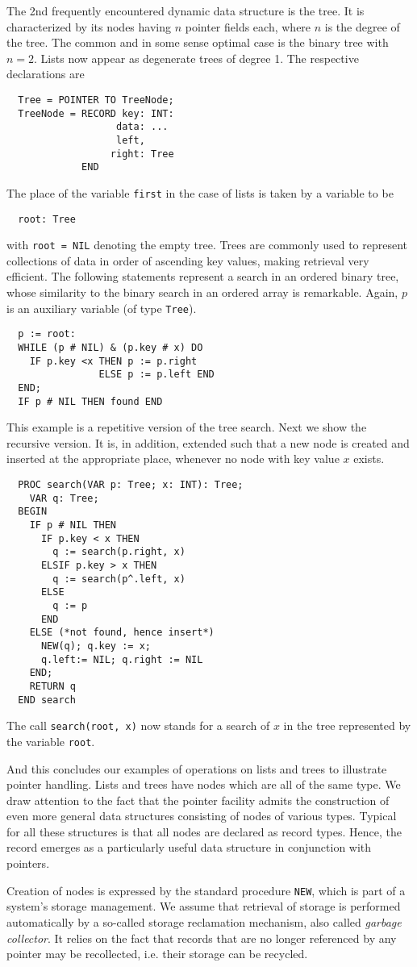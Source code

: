 The 2nd frequently encountered dynamic data structure is the tree. It is characterized by
its nodes having $n$ pointer fields each, where $n$ is the degree of the tree. The common
and in some sense optimal case is the binary tree with $n = 2$. Lists now appear as
degenerate trees of degree 1.  The respective declarations are
\begin{verbatim}
  Tree = POINTER TO TreeNode;
  TreeNode = RECORD key: INT:
                   data: ...
                   left,
                  right: Tree
             END
\end{verbatim}
The place of the variable \verb|first| in the case of lists is taken by a variable to be
\begin{verbatim}
  root: Tree
\end{verbatim}
with \verb|root = NIL| denoting the empty tree. Trees are commonly used to represent
collections of data in order of ascending key values, making retrieval very efficient.
The following statements represent a search in an ordered binary tree, whose similarity
to the binary search in an ordered array is remarkable. Again, $p$ is an auxiliary
variable (of type \verb|Tree|).
\begin{verbatim}
  p := root:
  WHILE (p # NIL) & (p.key # x) DO
    IF p.key <x THEN p := p.right
                ELSE p := p.left END
  END;
  IF p # NIL THEN found END
\end{verbatim}
This example is a repetitive version of the tree search. Next we show the recursive version.
It is, in addition, extended such that a new node is created and inserted at the appropriate
place, whenever no node with key value $x$ exists.
\begin{verbatim}
  PROC search(VAR p: Tree; x: INT): Tree;
    VAR q: Tree;
  BEGIN
    IF p # NIL THEN
      IF p.key < x THEN
        q := search(p.right, x)
      ELSIF p.key > x THEN
        q := search(p^.left, x)
      ELSE
        q := p
      END
    ELSE (*not found, hence insert*)
      NEW(q); q.key := x;
      q.left:= NIL; q.right := NIL
    END;
    RETURN q
  END search
\end{verbatim}
The call \verb|search(root, x)| now stands for a search of $x$ in the tree represented by
the variable \verb|root|.

And this concludes our examples of operations on lists and trees to illustrate pointer
handling. Lists and trees have nodes which are all of the same type. We draw attention to
the fact that the pointer facility admits the construction of even more general data
structures consisting of nodes of various types. Typical for all these structures is that
all nodes are declared as record types. Hence, the record emerges as a particularly useful
data structure in conjunction with pointers.

Creation of nodes is expressed by the standard procedure \verb|NEW|, which is part of a
system's storage management. We assume that retrieval of storage is performed automatically
by a so-called storage reclamation mechanism, also called \emph{garbage collector}. It
relies on the fact that records that are no longer referenced by any pointer may be
recollected, i.e. their storage can be recycled.

